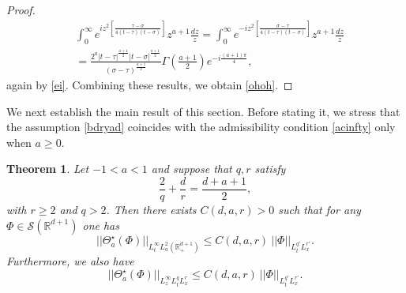 \documentclass[11pt,letter]{amsart}
\def \RN {\mathbb{R}_+^{d+1}}
\def \R {\mathbb{R}}
\def \G{\Gamma}
\numberwithin{equation}{section}
\newtheorem{theorem}{Theorem}[section]
\numberwithin{equation}{section}
\begin{document}
\begin{proof}
\begin{align*}
& \int_0^\infty  e^{i z^2\left[\frac{\tau-\sigma}{4(t-\tau)(t-\sigma)}\right]} z^{a+1} \frac{dz}z =  \int_0^\infty  e^{- i z^2\left[\frac{\sigma-\tau}{4(t-\tau)(t-\sigma)}\right]} z^{a+1} \frac{dz}z
\\
&  = \frac{2^{a}|t-\tau|^{\frac{a+1}2}|t-\sigma|^{\frac{a+1}2}}{(\sigma-\tau)^{\frac{a+1}2}} \G(\frac{a+1}2) e^{-i\frac{(a+1)\pi}{4}},
\end{align*}
again by \eqref{ei}.
Combining these results, we obtain \eqref{ohoh}.



\end{proof}

We next establish the main result of this section. Before stating it, we stress that the assumption \eqref{bdryad} coincides with the admissibility condition \eqref{acinfty} only when $a\ge 0$. 

\begin{theorem}\label{T:V}
Let $-1<a<1$ and suppose that $q, r$
satisfy
\begin{equation}\label{bdryad}
\frac 2q + \frac dr = \frac{d+a+1}2,
\end{equation}
with $r\ge 2$ and 
 $q>2$. Then there exists $C(d,a,r)>0$ such that for any $\Phi\in \mathscr S(\R^{d+1})$ one has
\begin{equation}\label{ok}
||\Theta_a^\star(\Phi)||_{L^\infty_t L^2_a(\RN)} \le C(d,a,r)\ ||\Phi||_{L^{q'}_t L^{r'}_x}.
\end{equation}
Furthermore, we also have
\begin{equation}\label{okk}
||\Theta_a^\star(\Phi)||_{L^\infty_{z} L^q_t L^r_x } \le C(d,a,r)\ ||\Phi||_{L^{q'}_t L^{r'}_x}.
\end{equation}
\end{theorem}
\end{document}
